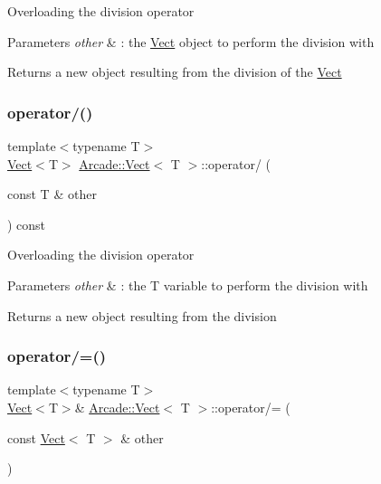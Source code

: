 Overloading the division operator 
\begin{DoxyParams}{Parameters}
{\em other} & \+: the \hyperlink{class_arcade_1_1_vect}{Vect} object to perform the division with \\
\hline
\end{DoxyParams}
\begin{DoxyReturn}{Returns}
a new object resulting from the division of the \hyperlink{class_arcade_1_1_vect}{Vect} 
\end{DoxyReturn}
\mbox{\label{class_arcade_1_1_vect_ad7cab0bc6711c2b9ec6aa5d11614f01e}} 
\subsubsection{\texorpdfstring{operator/()}{operator/()}\hspace{0.1cm}{\footnotesize\ttfamily [2/2]}}
{\footnotesize\ttfamily template$<$typename T$>$ \\
\hyperlink{class_arcade_1_1_vect}{Vect}$<$T$>$ \hyperlink{class_arcade_1_1_vect}{Arcade\+::\+Vect}$<$ T $>$\+::operator/ (\begin{DoxyParamCaption}\item[{const T \&}]{other }\end{DoxyParamCaption}) const\hspace{0.3cm}{\ttfamily [inline]}}

Overloading the division operator 
\begin{DoxyParams}{Parameters}
{\em other} & \+: the T variable to perform the division with \\
\hline
\end{DoxyParams}
\begin{DoxyReturn}{Returns}
a new object resulting from the division 
\end{DoxyReturn}
\mbox{\label{class_arcade_1_1_vect_ae3114c792862c161769fbe2d1ce25df8}} 
\subsubsection{\texorpdfstring{operator/=()}{operator/=()}\hspace{0.1cm}{\footnotesize\ttfamily [1/2]}}
{\footnotesize\ttfamily template$<$typename T$>$ \\
\hyperlink{class_arcade_1_1_vect}{Vect}$<$T$>$\& \hyperlink{class_arcade_1_1_vect}{Arcade\+::\+Vect}$<$ T $>$\+::operator/= (\begin{DoxyParamCaption}\item[{const \hyperlink{class_arcade_1_1_vect}{Vect}$<$ T $>$ \&}]{other }\end{DoxyParamCaption})\hspace{0.3cm}{\ttfamily [inline]}}

